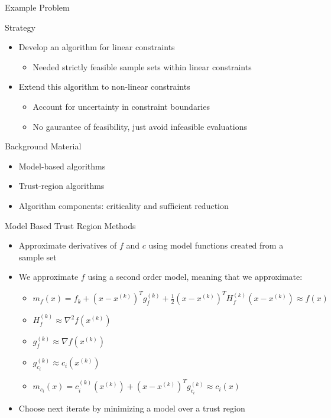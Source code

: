 \documentclass{beamer}
\newcommand{\xk}{{{x}^{(k)}}}
\newcommand{\mk}{{m_f}}
\newcommand{\fk}{{f_k}}
\newcommand{\fgk}{{g^{(k)}_f}}
\newcommand{\fhk}{{H^{(k)}_f}}
\newcommand{\ck}{{c^{(k)}_{i}(\xk)}}
\newcommand{\cgk}{{g^{(k)}_{c_i}}}
\newcommand{\mck}{{m_{c_i}}}
\begin{document}
\begin{frame}{Example Problem}

\end{frame}


\begin{frame}{Strategy}
	\begin{itemize}
		\item Develop an algorithm for linear constraints
		\begin{itemize}
			\item Needed strictly feasible sample sets within linear constraints
		\end{itemize}
		\item Extend this algorithm to non-linear constraints
		\begin{itemize}
			\item Account for uncertainty in constraint boundaries
			\item No gaurantee of feasibility, just avoid infeasible evaluations
		\end{itemize}
	\end{itemize}
\end{frame}




\begin{frame}{Background Material}
	\begin{itemize}
		\item Model-based algorithms
		\item Trust-region algorithms
		\item Algorithm components: criticality and sufficient reduction
	\end{itemize}
\end{frame}

\begin{frame}{Model Based Trust Region Methods}
	\begin{itemize}
		\setlength\itemsep{2em}
		\item Approximate derivatives of $f$ and $c$ using model functions created from a sample set
		\item We approximate $f$ using a second order model, meaning that we approximate:
		\begin{itemize}
			\item $\mk(x) = \fk + \left(x - \xk \right)^T\fgk + \frac 1 2 \left(x - \xk \right)^T\fhk\left(x - \xk \right) \approx f(x)$
			\item $\fhk \approx \nabla ^2 f(\xk)$
			\item $\fgk \approx \nabla f(\xk)$
			\item $\cgk \approx c_i(\xk)$
			\item $\mck(x) = \ck + \left(x - \xk\right)^T\cgk \approx c_i(x)$
		\end{itemize}
		\item Choose next iterate by minimizing a model over a trust region
	\end{itemize}
\end{frame}
\end{document}

